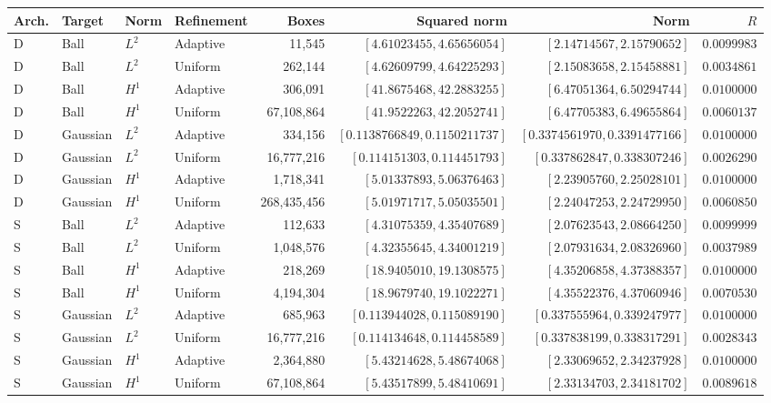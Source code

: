 \begin{longtable}{@{}llllrrrr@{}}
\toprule
Arch. & Target & Norm & Refinement & Boxes & Squared norm & Norm & $R$ \\
\midrule
\endhead
D & Ball & $L^2$ & Adaptive & 11,545 & $[4.61023455,4.65656054]$ & $[2.14714567,2.15790652]$ & $0.0099983$ \\
D & Ball & $L^2$ & Uniform & 262,144 & $[4.62609799,4.64225293]$ & $[2.15083658,2.15458881]$ & $0.0034861$ \\
D & Ball & $H^1$ & Adaptive & 306,091 & $[41.8675468,42.2883255]$ & $[6.47051364,6.50294744]$ & $0.0100000$ \\
D & Ball & $H^1$ & Uniform & 67,108,864 & $[41.9522263,42.2052741]$ & $[6.47705383,6.49655864]$ & $0.0060137$ \\
D & Gaussian & $L^2$ & Adaptive & 334,156 & $[0.1138766849,0.1150211737]$ & $[0.3374561970,0.3391477166]$ & $0.0100000$ \\
D & Gaussian & $L^2$ & Uniform & 16,777,216 & $[0.114151303,0.114451793]$ & $[0.337862847,0.338307246]$ & $0.0026290$ \\
D & Gaussian & $H^1$ & Adaptive & 1,718,341 & $[5.01337893,5.06376463]$ & $[2.23905760,2.25028101]$ & $0.0100000$ \\
D & Gaussian & $H^1$ & Uniform & 268,435,456 & $[5.01971717,5.05035501]$ & $[2.24047253,2.24729950]$ & $0.0060850$ \\
S & Ball & $L^2$ & Adaptive & 112,633 & $[4.31075359,4.35407689]$ & $[2.07623543,2.08664250]$ & $0.0099999$ \\
S & Ball & $L^2$ & Uniform & 1,048,576 & $[4.32355645,4.34001219]$ & $[2.07931634,2.08326960]$ & $0.0037989$ \\
S & Ball & $H^1$ & Adaptive & 218,269 & $[18.9405010,19.1308575]$ & $[4.35206858,4.37388357]$ & $0.0100000$ \\
S & Ball & $H^1$ & Uniform & 4,194,304 & $[18.9679740,19.1022271]$ & $[4.35522376,4.37060946]$ & $0.0070530$ \\
S & Gaussian & $L^2$ & Adaptive & 685,963 & $[0.113944028,0.115089190]$ & $[0.337555964,0.339247977]$ & $0.0100000$ \\
S & Gaussian & $L^2$ & Uniform & 16,777,216 & $[0.114134648,0.114458589]$ & $[0.337838199,0.338317291]$ & $0.0028343$ \\
S & Gaussian & $H^1$ & Adaptive & 2,364,880 & $[5.43214628,5.48674068]$ & $[2.33069652,2.34237928]$ & $0.0100000$ \\
S & Gaussian & $H^1$ & Uniform & 67,108,864 & $[5.43517899,5.48410691]$ & $[2.33134703,2.34181702]$ & $0.0089618$ \\
\bottomrule
\end{longtable}
